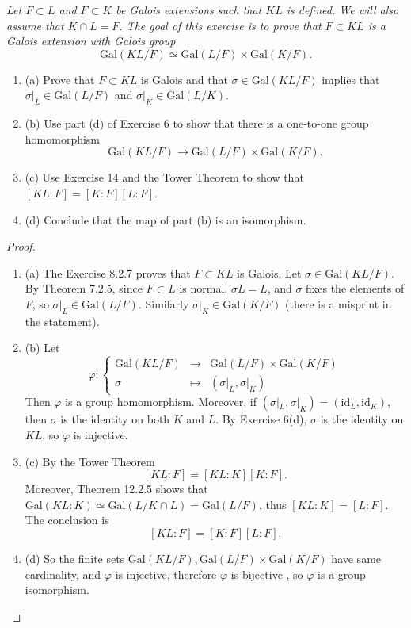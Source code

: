 \documentclass[11pt,a4paper]{article}
\newcommand{\be} {\begin{enumerate}}
\newcommand{\ee} {\end{enumerate}}
\newcommand{\Gal}{\mathrm{Gal}}
\begin{document}
{\it Let $F \subset L$ and $F \subset K$ be Galois extensions such that $KL$ is defined. We will also assume that $K\cap L = F$. The goal of this exercise is to prove that $F \subset KL$ is a Galois extension with Galois group
$$\Gal(KL/F) \simeq \Gal(L/F) \times \Gal(K/F).$$
\be
\item[(a)] Prove that $F \subset KL$ is Galois and that $\sigma \in \Gal(KL/F)$ implies that $\sigma \vert_L \in \Gal(L/F)$ and $\sigma \vert_K \in \Gal(L/K)$.

\item[(b)] Use part (d) of Exercise 6 to show that there is a one-to-one group homomorphism
$$\Gal(KL/F) \to \Gal(L/F) \times \Gal(K/F).$$

\item[(c)] Use Exercise 14 and the Tower Theorem to show that $[KL:F] = [K:F][L:F]$.

\item[(d)] Conclude that the map of part (b) is an isomorphism.
\ee
}

\begin{proof}
\be
\item[(a)] The Exercise 8.2.7 proves that $F \subset KL$ is Galois. Let $\sigma \in \Gal(KL/F)$. By Theorem 7.2.5, since $F \subset L$ is normal, $\sigma L = L$, and $\sigma$ fixes the elements of $F$, so $\sigma|_L \in \Gal(L/F)$. Similarly $\sigma \vert_K \in \Gal(K/F)$ (there is a misprint in the statement).

\item[(b)] Let
$$\varphi :
\left\{
\begin{array}{lll}
\Gal(KL/F)& \to& \Gal(L/F) \times \Gal(K/F)\\
\sigma &\mapsto & (\sigma|_L, \sigma \vert_K)
\end{array}
\right.
$$
Then $\varphi$ is a group homomorphism. Moreover, if $(\sigma|_L, \sigma|_K) = (\mathrm{id}_L,\mathrm{id}_K)$, then $\sigma$ is the identity on both $K$ and $L$. By Exercise 6(d), $\sigma$ is the identity on $KL$, so $\varphi$ is injective.

\item[(c)] By the Tower Theorem
$$[KL : F] = [KL:K][K:F].$$
Moreover, Theorem 12.2.5 shows that $\Gal(KL:K) \simeq \Gal(L/K\cap L) = \Gal(L/F)$, thus $[KL:K] = [L:F]$. The conclusion is
$$[KL:F] = [K:F][L:F].$$

\item[(d)] So the finite sets $\Gal(KL/F),  \Gal(L/F) \times \Gal(K/F)$ have same cardinality, and $\varphi$ is injective, therefore $\varphi$ is bijective , so $\varphi$ is a group isomorphism.
\ee
\end{proof}
\end{document}
